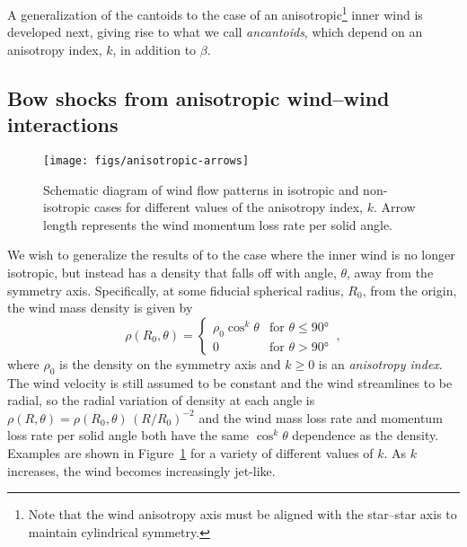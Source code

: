 \documentclass[useAMS, usenatbib, a4paper]{mnras}
\begin{document}
A generalization of the cantoids to the case of an
anisotropic\footnote{Note that the wind anisotropy axis must be
  aligned with the star--star axis to maintain cylindrical symmetry.}
inner wind is developed next, giving rise
to what we call \textit{ancantoids}, which depend on an anisotropy
index, \(k\), in addition to \(\beta\).  

\subsection{Bow shocks from anisotropic wind--wind interactions}
\label{sec:ancantoid}
\begin{figure}
  \centering
  \texttt{[image: figs/anisotropic-arrows]}
  \caption[]{Schematic diagram of wind flow patterns in isotropic and
    non-isotropic cases for different values of the anisotropy index,
    \(k\).  Arrow length represents the wind momentum loss rate per
    solid angle.}
  \label{fig:anisotropic-arrows}
\end{figure}


We wish to generalize the results of \citet[\CRW{}]{Canto:1996} to the
case where the inner wind is no longer isotropic, but instead has a
density that falls off with angle, \(\theta\), away from the symmetry axis.
Specifically, at some fiducial spherical radius, \(R_0\), from the
origin, the wind mass density is given by
\begin{equation}
  \label{eq:ancantoid-density}
  \rho(R_0, \theta) =
  \begin{cases}
    \rho_0 \cos^k \theta & \text{for \(\theta \le \ang{90}\)} \\
    0 & \text{for \(\theta > \ang{90}\)}
  \end{cases}
  \ ,
\end{equation}
where \(\rho_0\) is the density on the symmetry axis and \(k \ge 0\) is an
\textit{anisotropy index}.  The wind velocity is still assumed to be
constant and the wind streamlines to be radial, so the radial
variation of density at each angle is
\(\rho(R, \theta) = \rho(R_0, \theta)\, (R/R_0)^{-2}\) and the wind mass loss rate and
momentum loss rate per solid angle both have the same \(\cos^k\theta\)
dependence as the density.  Examples are shown in
Figure~\ref{fig:anisotropic-arrows} for a variety of different values
of \(k\).  As \(k\) increases, the wind becomes increasingly jet-like.
\end{document}
